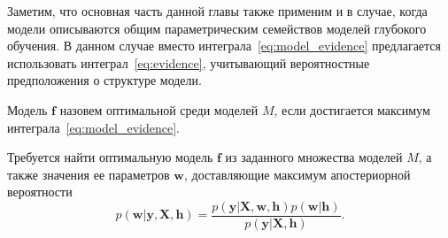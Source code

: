 Заметим, что основная часть данной главы также применим и в случае, когда модели описываются общим параметрическим семействов моделей глубокого обучения. В данном случае вместо интеграла~\eqref{eq:model_evidence} предлагается использовать интеграл~\eqref{eq:evidence}, учитывающий вероятностные предположения о структуре модели.


\begin{defin}Модель  $\mathbf{f}$ назовем оптимальной среди моделей $M$, если достигается максимум интеграла~\eqref{eq:model_evidence}.
\end{defin}


Требуется найти оптимальную модель $\mathbf{f}$ из заданного множества моделей $M$, а также значения ее параметров $\mathbf{w}$, доставляющие максимум апостериорной вероятности
\begin{equation}
\label{eq:var_inf_posterior}
	p(\mathbf{w}|\mathbf{y},\mathbf{X},\mathbf{h}) = \frac{p(\mathbf{y}|\mathbf{X}, \mathbf{w}, \mathbf{h})p(\mathbf{w}|\mathbf{h})}{p(\mathbf{y}|\mathbf{X}, \mathbf{h})}.
\end{equation}


